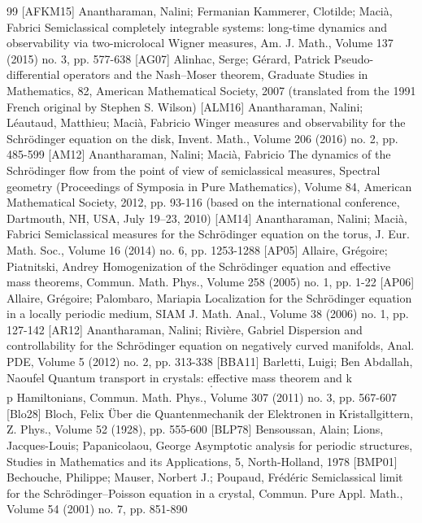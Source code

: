 \begin{thebibliography}{99}
 [AFKM15] Anantharaman, Nalini; Fermanian Kammerer, Clotilde; Macià, Fabrici Semiclassical completely integrable systems: long-time dynamics and observability via two-microlocal Wigner measures, Am. J. Math., Volume 137 (2015) no. 3, pp. 577-638
 [AG07] Alinhac, Serge; Gérard, Patrick Pseudo-differential operators and the Nash–Moser theorem, Graduate Studies in Mathematics, 82, American Mathematical Society, 2007 (translated from the 1991 French original by Stephen S. Wilson)
 [ALM16] Anantharaman, Nalini; Léautaud, Matthieu; Macià, Fabricio Winger measures and observability for the Schrödinger equation on the disk, Invent. Math., Volume 206 (2016) no. 2, pp. 485-599
 [AM12] Anantharaman, Nalini; Macià, Fabricio The dynamics of the Schrödinger flow from the point of view of semiclassical measures, Spectral geometry (Proceedings of Symposia in Pure Mathematics), Volume 84, American Mathematical Society, 2012, pp. 93-116 (based on the international conference, Dartmouth, NH, USA, July 19–23, 2010)
 [AM14] Anantharaman, Nalini; Macià, Fabrici Semiclassical measures for the Schrödinger equation on the torus, J. Eur. Math. Soc., Volume 16 (2014) no. 6, pp. 1253-1288
 [AP05] Allaire, Grégoire; Piatnitski, Andrey Homogenization of the Schrödinger equation and effective mass theorems, Commun. Math. Phys., Volume 258 (2005) no. 1, pp. 1-22
 [AP06] Allaire, Grégoire; Palombaro, Mariapia Localization for the Schrödinger equation in a locally periodic medium, SIAM J. Math. Anal., Volume 38 (2006) no. 1, pp. 127-142
 [AR12] Anantharaman, Nalini; Rivière, Gabriel Dispersion and controllability for the Schrödinger equation on negatively curved manifolds, Anal. PDE, Volume 5 (2012) no. 2, pp. 313-338
 [BBA11] Barletti, Luigi; Ben Abdallah, Naoufel Quantum transport in crystals: effective mass theorem and k$$\cdot $$p Hamiltonians, Commun. Math. Phys., Volume 307 (2011) no. 3, pp. 567-607
 [Blo28] Bloch, Felix Über die Quantenmechanik der Elektronen in Kristallgittern, Z. Phys., Volume 52 (1928), pp. 555-600
 [BLP78] Bensoussan, Alain; Lions, Jacques-Louis; Papanicolaou, George Asymptotic analysis for periodic structures, Studies in Mathematics and its Applications, 5, North-Holland, 1978
 [BMP01] Bechouche, Philippe; Mauser, Norbert J.; Poupaud, Frédéric Semiclassical limit for the Schrödinger–Poisson equation in a crystal, Commun. Pure Appl. Math., Volume 54 (2001) no. 7, pp. 851-890

\end{thebibliography}
